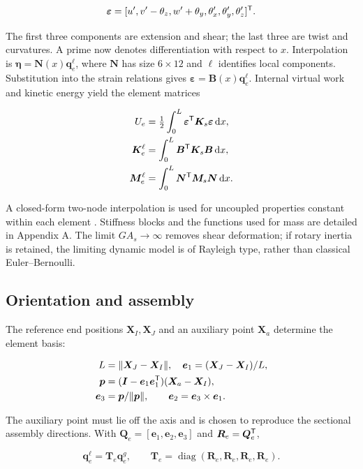 \begin{equation}
\bm\varepsilon=[u',v'-\theta_z,w'+\theta_y,
\theta_x',\theta_y',\theta_z']^\mathsf T.
\end{equation}

The first three components are extension and shear; the last three are twist and curvatures. A prime now denotes differentiation with respect to $x$. Interpolation is $\bm\eta=\bm N(x)\bm q_e^\ell$, where $\bm N$ has size $6\times12$ and $\ell$ identifies local components. Substitution into the strain relations gives $\bm\varepsilon=\bm B(x)\bm q_e^\ell$. Internal virtual work and kinetic energy yield the element matrices

\begin{align}
U_e&=\tfrac12\int_0^L\bm\varepsilon^\mathsf T\bm K_s\bm\varepsilon\,\mathrm d x,\nonumber\\
\bm K_e^\ell&=\int_0^L\bm B^\mathsf T\bm K_s\bm B\,\mathrm d x,\nonumber\\
\bm M_e^\ell&=\int_0^L\bm N^\mathsf T\bm M_s\bm N\,\mathrm d x.
\label{eq:elementenergy}
\end{align}

A closed-form two-node interpolation is used for uncoupled properties constant within each element \citep{reddy2006}. Stiffness blocks and the functions used for mass are detailed in Appendix A. The limit $GA_s\to\infty$ removes shear deformation; if rotary inertia is retained, the limiting dynamic model is of Rayleigh type, rather than classical Euler--Bernoulli.

\subsection{Orientation and assembly}
The reference end positions $\bm X_I,\bm X_J$ and an auxiliary point $\bm X_a$ determine the element basis:

\begin{align}
L&=\|\bm X_J-\bm X_I\|,\quad
\bm e_1=(\bm X_J-\bm X_I)/L,\nonumber\\
\bm p&=(\bm I-\bm e_1\bm e_1^\mathsf T)(\bm X_a-\bm X_I),\nonumber\\
\bm e_3&=\bm p/\|\bm p\|,\qquad
\bm e_2=\bm e_3\times\bm e_1.
\label{eq:base-elemento}
\end{align}

The auxiliary point must lie off the axis and is chosen to reproduce the sectional assembly directions. With $\bm Q_e=[\bm e_1,\bm e_2,\bm e_3]$ and $\bm R_e=\bm Q_e^\mathsf T$,

\begin{equation}
\bm q_e^\ell=\bm T_e\bm q_e^g,\qquad
\bm T_e=\operatorname{diag}(\bm R_e,\bm R_e,\bm R_e,\bm R_e).
\end{equation}

